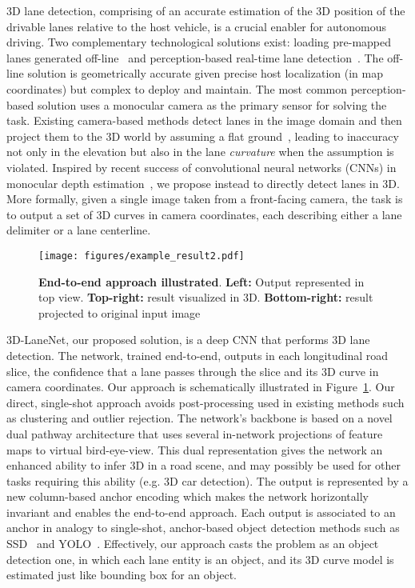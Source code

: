 \documentclass[10pt,twocolumn,letterpaper]{article}
\begin{document}
3D lane detection, comprising of an accurate estimation of the 3D position of the drivable lanes relative to the host vehicle, is a crucial enabler for autonomous driving. Two complementary technological solutions exist: loading pre-mapped lanes generated off-line~\cite{Urmson_boss} and perception-based real-time lane detection~\cite{aharon}. The off-line solution is geometrically accurate given precise host localization (in map coordinates) but complex to deploy and maintain. The most common perception-based solution uses a monocular camera as the primary sensor for solving the task. Existing camera-based methods detect lanes in the image domain and then project them to the 3D world by assuming a flat ground~\cite{aharon}, leading to inaccuracy not only in the elevation but also in the lane \textit{curvature} when the assumption is violated. Inspired by recent success of convolutional neural networks (CNNs) in monocular depth estimation~\cite{Liu_Depth}, we propose instead to directly detect lanes in 3D. More formally, given a single image taken from a front-facing camera, the task is to output a set of 3D curves in camera coordinates, each describing either a lane delimiter or a lane centerline.

\begin{figure}[ht]
	\begin{center}
		\texttt{[image: figures/example\_result2.pdf]}
	\end{center}	
	\caption{\textbf{End-to-end approach illustrated}. \textbf{Left:} Output represented in top view. \textbf{Top-right: }result visualized in 3D. \textbf{Bottom-right:} result projected to original input image}
	\label{fig:tusimple}
\end{figure}

3D-LaneNet, our proposed solution, is a deep CNN that performs 3D lane detection. The network, trained end-to-end, outputs in each longitudinal road slice, the confidence that a lane passes through the slice and its 3D curve in camera coordinates. Our approach is schematically illustrated in Figure~\ref{fig:tusimple}. Our direct, single-shot approach avoids post-processing used in existing methods such as clustering and outlier rejection. The network's backbone is based on a novel dual pathway architecture that uses several in-network projections of feature maps to virtual bird-eye-view. This dual representation gives the network an enhanced ability to infer 3D in a road scene, and may possibly be used for other tasks requiring this ability (e.g. 3D car detection). The output is represented by a new column-based anchor encoding which makes the network horizontally invariant and enables the end-to-end approach. Each output is associated to an anchor in analogy to single-shot, anchor-based object detection methods such as SSD~\cite{SSD} and YOLO~\cite{YOLO}. Effectively, our approach casts the problem as an object detection one, in which each lane entity is an object, and its 3D curve model is estimated just like bounding box for an object.
\end{document}
